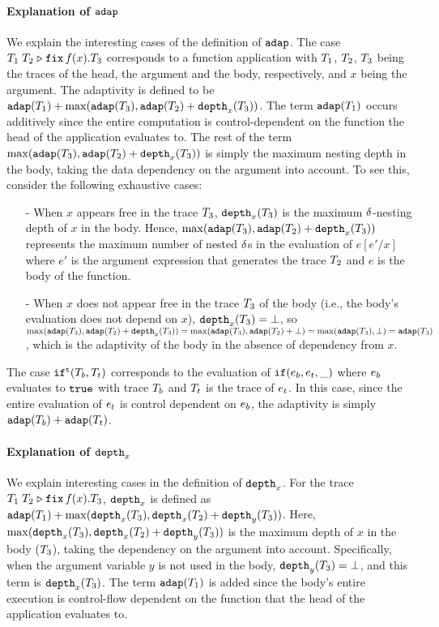 \documentclass[a4paper,11pt]{article}
\theoremstyle{definition}
\begin{document}
\paragraph{Explanation of $\mathtt{adap}$}
We explain the interesting cases of the definition of $\mathtt{adap}$. The
case $T_1 \; T_2 \mathrel{\triangleright} {\mathop{\mathtt{fix}} f(x).T_3}$ corresponds to a function
application with $T_1$, $T_2$, $T_3$ being the traces of the
head, the argument and the body, respectively, and $x$ being the
argument. The adaptivity is defined to be $\mathtt{adap}(T_1) +
\max(\mathtt{adap}(T_3), \mathtt{adap}(T_2) + \mathtt{depth}_{x}(T_3))$. The term
$\mathtt{adap}(T_1)$ occurs additively since the entire computation is
control-dependent on the function the head of the application
evaluates to. The rest of the term $\max(\mathtt{adap}(T_3), \mathtt{adap}(T_2) +
\mathtt{depth}_{x}(T_3))$ is simply the maximum nesting depth in the body,
taking the data dependency on the argument into account. To see this,
consider the following exhaustive cases:
\begin{itemize}
  \item[-] When $x$ appears free in the trace $T_3$,
    $\mathtt{depth}_{x}(T_3)$ is the maximum $\delta$-nesting depth of $x$ in
    the body. Hence, $\max(\mathtt{adap}(T_3), \mathtt{adap}(T_2) +
    \mathtt{depth}_{x}(T_3))$ represents the maximum number of nested $\delta$s
    in the evaluation of $e[e'/x]$ where $e'$ is the argument
    expression that generates the trace $T_2$ and $e$ is the body of
    the function.
  \item[-] When $x$ does not appear free in the trace $T_3$ of the
    body (i.e., the body's evaluation does not depend on $x$),
    $\mathtt{depth}_{x}(T_3) = \bot$, so $\max(\mathtt{adap}(T_3), \mathtt{adap}(T_2) +
    \mathtt{depth}_{x}(T_3)) = \max(\mathtt{adap}(T_3), \mathtt{adap}(T_2) + \bot) =
    \max(\mathtt{adap}(T_3), \bot) = \mathtt{adap}(T_3)$, which is the adaptivity
    of the body in the absence of dependency from $x$.
\end{itemize}

The case $\mathtt{if}^{\mathtt{t}}(T_b, T_t)$ corresponds to the evaluation of
$\mathtt{if}(e_b, e_t, \_)$ where $e_b$ evaluates to $\mathtt{true}$
with trace $T_b$ and $T_t$ is the trace of $e_t$. In this
case, since the entire evaluation of $e_t$ is control dependent on
$e_b$, the adaptivity is simply $\mathtt{adap}(T_b) + \mathtt{adap}(T_t)$.

\paragraph{Explanation of $\mathtt{depth}_{x}$}
We explain interesting cases in the definition of $\mathtt{depth}_{x}$.  For the
trace $T_1 \; T_2 \mathrel{\triangleright} {\mathop{\mathtt{fix}} f(x).T_3}$, $\mathtt{depth}_{x}$ is defined as
$\mathtt{adap}(T_1) + \max(\mathtt{depth}_{x}(T_3), \mathtt{depth}_{x}(T_2) +
\mathtt{depth}_{y}(T_3))$. Here, $\max(\mathtt{depth}_{x}(T_3), \mathtt{depth}_{x}(T_2) +
\mathtt{depth}_{y}(T_3))$ is the maximum depth of $x$ in the body ($T_3$),
taking the dependency on the argument into account. Specifically, when
the argument variable $y$ is not used in the body, $\mathtt{depth}_{y}(T_3) =
\bot$, and this term is $\mathtt{depth}_{x}(T_3)$.  The term $\mathtt{adap}(T_1)$ is
added since the body's entire execution is control-flow dependent on
the function that the head of the application evaluates to.
\end{document}
